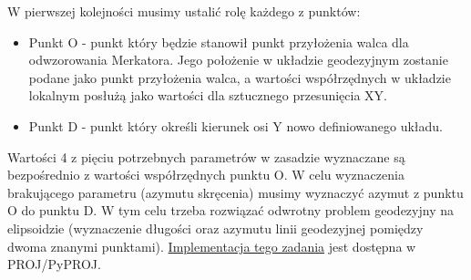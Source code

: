 \documentclass{article}
\begin{document}
W pierwszej kolejności musimy ustalić rolę każdego z punktów: 
\begin{itemize}
    \item Punkt O - punkt który będzie stanowił punkt przyłożenia walca dla odwzorowania Merkatora. Jego położenie w układzie geodezyjnym zostanie podane jako punkt przyłożenia walca, 
    a wartości współrzędnych w układzie lokalnym posłużą jako wartości dla sztucznego przesunięcia XY.
    \item Punkt D - punkt który określi kierunek osi Y nowo definiowanego układu. 
\end{itemize}

Wartości 4 z pięciu potrzebnych parametrów w zasadzie wyznaczane są bezpośrednio z wartości współrzędnych punktu O. W celu wyznaczenia brakującego parametru (azymutu skręcenia) 
musimy wyznaczyć azymut z punktu O do punktu D. W tym celu trzeba rozwiązać odwrotny problem geodezyjny na elipsoidzie (wyznaczenie długości oraz azymutu linii geodezyjnej 
pomiędzy dwoma znanymi punktami). \href{https://proj.org/en/stable/faq.html#what-is-the-best-format-for-describing-coordinate-reference-systems}{Implementacja tego zadania} jest dostępna w PROJ/PyPROJ.

\end{document}
